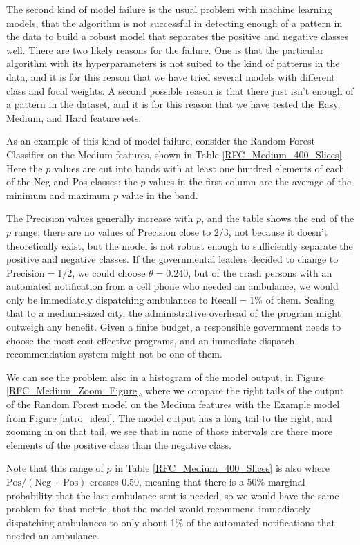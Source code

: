 \FloatBarrier

The second kind of model failure is the usual problem with machine learning models, that the algorithm is not successful in detecting enough of a pattern in the data to build a robust model that separates the positive and negative classes well.  There are two likely reasons for the failure.  One is that the particular algorithm with its hyperparameters is not suited to the kind of patterns in the data, and it is for this reason that we have tried several models with different class and focal weights.  A second possible reason is that there just isn't enough of a pattern in the dataset, and it is for this reason that we have tested the Easy, Medium, and Hard feature sets.  

As an example of this kind of model failure, consider the Random Forest Classifier on the Medium features, shown in Table \ref{RFC_Medium_400_Slices}.  Here the $p$ values are cut into bands with at least one hundred elements of each of the Neg and Pos classes; the $p$ values in the first column are the average of the minimum and maximum $p$ value in the band.  

The Precision values generally increase with $p$, and the table shows the end of the $p$ range; there are no values of Precision close to $2/3$, not because it doesn't theoretically exist, but the model is not robust enough to sufficiently separate the positive and negative classes.  If the governmental leaders decided to change to $\text{Precision} = 1/2$, we could choose $\theta = 0.240$, but of the crash persons with an automated notification from a cell phone who needed an ambulance, we would only be immediately dispatching ambulances to $\text{Recall} = 1\%$ of them.  Scaling that to a medium-sized city, the administrative overhead of the program might outweigh any benefit.  Given a finite budget, a responsible government needs to choose the most cost-effective programs, and an immediate dispatch recommendation system might not be one of them.  

We can see the problem also in a histogram of the model output, in Figure \ref{RFC_Medium_Zoom_Figure}, where we compare the right tails of the output of the Random Forest model on the Medium features with the Example model from Figure \ref{intro_ideal}.  The model output has a long tail to the right, and zooming in on that tail, we see that in none of those intervals are there more elements of the positive class than the negative class.  

Note that this range of $p$ in Table \ref{RFC_Medium_400_Slices} is also where $\text{Pos}/(\text{Neg} + \text{Pos})$ crosses 0.50, meaning that there is a 50\% marginal probability that the last ambulance sent is needed, so we would have the same problem for that metric, that the model would recommend immediately dispatching ambulances to only about 1\% of the automated notifications that needed an ambulance.  

